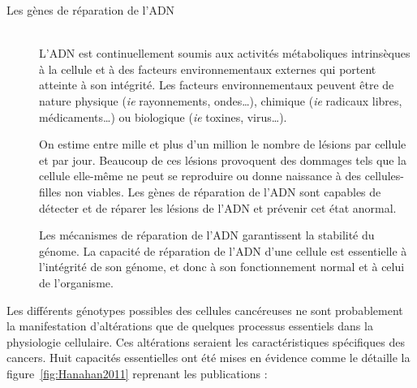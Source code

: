       \begin{description}
        \item [Les gènes de réparation de l'\acs{ADN}]  \hfill \\
          L'\acs{ADN} est continuellement soumis aux activités métaboliques intrinsèques à la cellule et à des facteurs environnementaux externes qui portent atteinte à son intégrité.
          Les facteurs environnementaux peuvent être de nature physique (\emph{ie} rayonnements, ondes\dots), chimique (\emph{ie} radicaux libres, médicaments\dots) ou biologique (\emph{ie} toxines, virus\dots).

          On estime entre mille et plus d'un million le nombre de lésions par cellule et par jour.
          Beaucoup de ces lésions provoquent des dommages tels que la cellule elle-même ne peut se reproduire ou donne naissance à des cellules-filles non viables.
          Les gènes de réparation de l'\acs{ADN} sont capables de détecter et de réparer les lésions de l'\acs{ADN} et prévenir cet état anormal.

          Les mécanismes de réparation de l'\acs{ADN} garantissent la stabilité du génome.
          La capacité de réparation de l'\acs{ADN} d'une cellule est essentielle à l'intégrité de son génome, et donc à son fonctionnement normal et à celui de l'organisme.
      \end{description}
      \vspace{1.5ex}

      Les différents génotypes possibles des cellules cancéreuses ne sont probablement la manifestation d'altérations que de quelques processus essentiels dans la physiologie cellulaire.
      Ces altérations seraient les caractéristiques spécifiques des cancers.
      Huit capacités essentielles ont été mises en évidence comme le détaille la figure~\ref{fig:Hanahan2011} reprenant les publications \citet{Hanahan2000,Hanahan2011} :

      \begin{sidewaysfigure}
        \begin{center}
          \def\svgwidth{\columnwidth}
          
          \caption{Caractéristiques du Cancer inspiré de \citet{Hanahan2000,Hanahan2011}.}
          \label{fig:Hanahan2011}
        \end{center}
      \end{sidewaysfigure}

